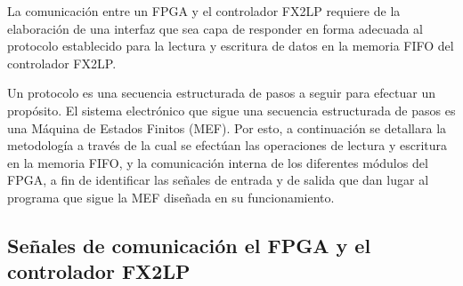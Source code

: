 La comunicación entre un FPGA y el controlador FX2LP requiere de la elaboración de una interfaz que sea capa de responder en forma adecuada al protocolo establecido para la lectura y escritura de datos en la memoria FIFO del controlador FX2LP.

Un protocolo es una secuencia estructurada de pasos a seguir para efectuar un propósito. El sistema electrónico que sigue una secuencia estructurada de pasos es una Máquina de Estados Finitos (MEF). Por esto, a continuación se detallara la metodología a través de la cual se efectúan las operaciones de lectura y escritura en la memoria FIFO, y la comunicación interna de los diferentes módulos del FPGA, a fin de identificar las señales de entrada y de salida que dan lugar al programa que sigue la MEF diseñada en su funcionamiento.




\subsection{Señales de comunicación el FPGA y el controlador FX2LP}

